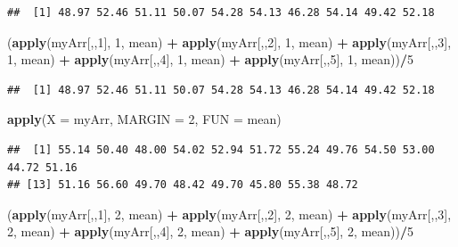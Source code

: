 \documentclass[
]{book}
\newenvironment{Shaded}{\begin{snugshade}}{\end{snugshade}}
\newcommand{\DataTypeTok}[1]{\textcolor[rgb]{0.13,0.29,0.53}{#1}}
\newcommand{\DecValTok}[1]{\textcolor[rgb]{0.00,0.00,0.81}{#1}}
\newcommand{\KeywordTok}[1]{\textcolor[rgb]{0.13,0.29,0.53}{\textbf{#1}}}
\newcommand{\NormalTok}[1]{#1}
\newcommand{\OperatorTok}[1]{\textcolor[rgb]{0.81,0.36,0.00}{\textbf{#1}}}
\newcommand{\StringTok}[1]{\textcolor[rgb]{0.31,0.60,0.02}{#1}}
\begin{document}
\begin{verbatim}
##  [1] 48.97 52.46 51.11 50.07 54.28 54.13 46.28 54.14 49.42 52.18
\end{verbatim}

\begin{Shaded}
\begin{Highlighting}[]
\NormalTok{(}\KeywordTok{apply}\NormalTok{(myArr[,,}\DecValTok{1}\NormalTok{], }\DecValTok{1}\NormalTok{, mean) }\OperatorTok{+}\StringTok{ }\KeywordTok{apply}\NormalTok{(myArr[,,}\DecValTok{2}\NormalTok{], }\DecValTok{1}\NormalTok{, mean) }\OperatorTok{+}\StringTok{ }
\StringTok{  }\KeywordTok{apply}\NormalTok{(myArr[,,}\DecValTok{3}\NormalTok{], }\DecValTok{1}\NormalTok{, mean) }\OperatorTok{+}\StringTok{ }\KeywordTok{apply}\NormalTok{(myArr[,,}\DecValTok{4}\NormalTok{], }\DecValTok{1}\NormalTok{, mean) }\OperatorTok{+}\StringTok{ }
\StringTok{  }\KeywordTok{apply}\NormalTok{(myArr[,,}\DecValTok{5}\NormalTok{], }\DecValTok{1}\NormalTok{, mean))}\OperatorTok{/}\DecValTok{5}
\end{Highlighting}
\end{Shaded}

\begin{verbatim}
##  [1] 48.97 52.46 51.11 50.07 54.28 54.13 46.28 54.14 49.42 52.18
\end{verbatim}

\begin{Shaded}
\begin{Highlighting}[]
\KeywordTok{apply}\NormalTok{(}\DataTypeTok{X =}\NormalTok{ myArr, }\DataTypeTok{MARGIN =} \DecValTok{2}\NormalTok{, }\DataTypeTok{FUN =}\NormalTok{ mean)}
\end{Highlighting}
\end{Shaded}

\begin{verbatim}
##  [1] 55.14 50.40 48.00 54.02 52.94 51.72 55.24 49.76 54.50 53.00 44.72 51.16
## [13] 51.16 56.60 49.70 48.42 49.70 45.80 55.38 48.72
\end{verbatim}

\begin{Shaded}
\begin{Highlighting}[]
\NormalTok{(}\KeywordTok{apply}\NormalTok{(myArr[,,}\DecValTok{1}\NormalTok{], }\DecValTok{2}\NormalTok{, mean) }\OperatorTok{+}\StringTok{ }\KeywordTok{apply}\NormalTok{(myArr[,,}\DecValTok{2}\NormalTok{], }\DecValTok{2}\NormalTok{, mean) }\OperatorTok{+}\StringTok{ }
\StringTok{  }\KeywordTok{apply}\NormalTok{(myArr[,,}\DecValTok{3}\NormalTok{], }\DecValTok{2}\NormalTok{, mean) }\OperatorTok{+}\StringTok{ }\KeywordTok{apply}\NormalTok{(myArr[,,}\DecValTok{4}\NormalTok{], }\DecValTok{2}\NormalTok{, mean) }\OperatorTok{+}\StringTok{ }
\StringTok{  }\KeywordTok{apply}\NormalTok{(myArr[,,}\DecValTok{5}\NormalTok{], }\DecValTok{2}\NormalTok{, mean))}\OperatorTok{/}\DecValTok{5}
\end{Highlighting}
\end{Shaded}
\end{document}
